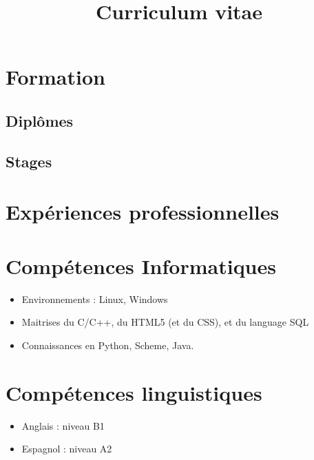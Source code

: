 \documentclass[11pt,a4paper,sans]{moderncv}
\title{Curriculum vitae}
\begin{document}
\makecvtitle

\section{Formation}
\subsection{Diplômes}
\subsection{Stages}

\section{Expériences professionnelles}

\section{Compétences Informatiques}
\begin{itemize}
\item Environnements : Linux, Windows
\item Maitrises du C/C++, du HTML5 (et du CSS), et du language SQL
\item Connaissances en Python, Scheme, Java.
\end{itemize}

\section{Compétences linguistiques}
\begin{itemize}
\item Anglais :  niveau B1
\item Espagnol : niveau A2\\
\end{itemize}

\clearpage
\end{document}
